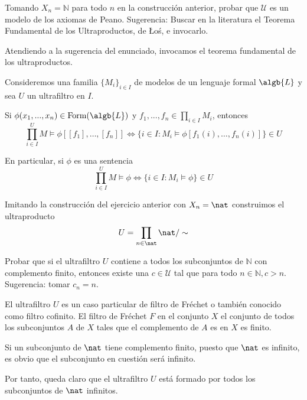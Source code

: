\begin{problem}
Tomando $X_n = \mathbb{N}$ para todo $n$ en la construcción anterior, probar que $\mathcal{U}$ es un modelo de los axiomas de Peano. Sugerencia: Buscar en la literatura el Teorema Fundamental de los Ultraproductos, de {\L}o\'s, e invocarlo.

\solution

Atendiendo a la sugerencia del enunciado, invocamos el teorema fundamental de los ultraproductos.

\begin{theorem}
Consideremos una familia $\{M_i\}_{i\in I}$ de modelos de un lenguaje formal $\algb{L}$ y sea $U$ un ultrafiltro en $I$.

Si $\phi(x_1,...,x_n) \in \text{Form}(\algb{L})$ y $f_1,...,f_n \in \prod_{i \in I} M_i$, entonces
\[\prod_{i\in I}^U M \models \phi[[f_1], \ldots, [f_n]] \iff \{ i \in I : M_{i} \models \phi[f_1(i), \ldots, f_n(i) ] \} \in U\]

En particular, si $\phi$ es una sentencia
\[\prod_{i\in I}^U M \models \phi \iff \{ i \in I : M_i \models \phi\} \in U\]
\end{theorem}

Imitando la construcción del ejercicio anterior con $X_n = \nat$ construimos el ultraproducto
\[U = \prod_{n \in \nat}\nat/\sim\]

\end{problem}

\begin{problem}
Probar que si el ultrafiltro $U$ contiene a todos los subconjuntos de $\mathbb{N}$ con complemento finito, entonces
existe una $c\in \mathcal{U}$ tal que para todo $n\in \mathbb{N}, c>n$. Sugerencia: tomar $c_n = n$.

\solution

El ultrafiltro $U$ es un caso particular de filtro de Fréchet o también conocido como filtro cofinito. El filtro de Fréchet $F$ en el conjunto $X$ el conjunto de todos los subconjuntos $A$ de $X$ tales que el complemento de $A$ es en $X$ es finito.

Si un subconjunto de $\nat$ tiene complemento finito, puesto que $\nat$ es infinito, es obvio que el subconjunto en cuestión será infinito.

Por tanto, queda claro que el ultrafiltro $U$ está formado por todos los subconjuntos de $\nat$ infinitos.

\end{problem}

